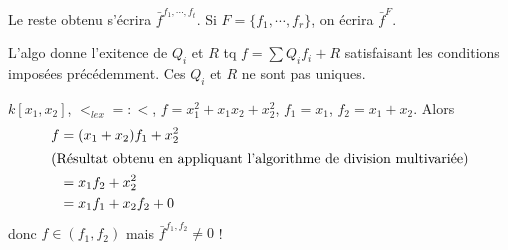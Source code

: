             \begin{nota}
                Le reste obtenu s'écrira $\bar f^{f_1, \cdots, f_t}$. Si $F = \{f_1, \cdots, f_r\}$, on écrira $\bar f^F$.
            \end{nota}
            \begin{remq}
                L'algo donne l'exitence de $Q_i$ et $R$ tq $f = \sum Q_if_i + R$ satisfaisant les conditions imposées précédemment. Ces $Q_i$ et $R$ ne sont pas uniques.
            \end{remq}
            \begin{expl}
                $k[x_1, x_2]$, $<_{lex} =: <$, $f = x_1^2 + x_1x_2 + x_2^2$, $f_1 = x_1$, $f_2 = x_1 + x_2$. Alors 
                \begin{align*}
                    f &= (x_1 + x_2)f_1 + x_2^2 \\
                    \intertext{(Résultat obtenu en appliquant l'algorithme de division multivariée)}
                    &= x_1f_2 + x_2^2 \\
                    &= x_1f_1 + x_2f_2 + 0 \\
                \end{align*}
                donc $f \in (f_1, f_2)$ mais $\bar f^{f_1, f_2} \neq 0$ !
            \end{expl}


